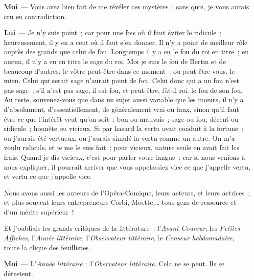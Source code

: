 \documentclass[french,twoside]{book} %
\newcommand{\labelchar}[1]{\textbf{\color{rubric} #1}}
\begin{document}
\labelchar{Moi} — Vous avez bien fait de me révéler ces mystères ; sans quoi, je vous aurais cru en contradiction.\par
\labelchar{Lui} — Je n’y suis point ; car pour une fois où il faut éviter le ridicule ; heureusement, il y en a cent où il faut s’en donner. Il n’y a point de meilleur rôle auprès des grands que celui de fou. Longtemps il y a eu le fou du roi en titre ; en aucun, il n’y a eu en titre le sage du roi. Moi je suis le fou de Bertin et de beaucoup d’autres, le vôtre peut-être dans ce moment ; ou peut-être vous, le mien. Celui qui serait sage n’aurait point de fou. Celui donc qui a un fou n’est pas sage ; s’il n’est pas sage, il est fou, et peut-être, fût-il roi, le fou de son fou. Au reste, souvenez-vous que dans un sujet aussi variable que les mœurs, il n’y a d’absolument, d’essentiellement, de généralement vrai ou faux, sinon qu’il faut être ce que l’intérêt veut qu’on soit ; bon ou mauvais ; sage ou fou, décent ou ridicule ; honnête ou vicieux. Si par hasard la vertu avait conduit à la fortune ; ou j’aurais été vertueux, ou j’aurais simulé la vertu comme un autre. On m’a voulu ridicule, et je me le suis fait ; pour vicieux, nature seule en avait fait les frais. Quand je dis vicieux, c’est pour parler votre langue ; car si nous venions à nous expliquer, il pourrait arriver que vous appelassiez vice ce que j’appelle vertu, et vertu ce que j’appelle vice.\par
Nous avons aussi les auteurs de l’Opéra-Comique, leurs acteurs, et leurs actrices ; et plus souvent leurs entrepreneurs Corbi, Moette,… tous gens de ressource et d’un mérite supérieur !\par
Et j’oubliais les grands critiques de la littérature : l’\emph{Avant-Coureur}, les\emph{ Petites Affiches}, l’\emph{Année littéraire}, l’\emph{Observateur littéraire}, le\emph{ Censeur hebdomadaire}, toute la clique des feuillistes.\par
\labelchar{Moi} — L’\emph{Année littéraire} ; l’\emph{Obervateur littéraire}. Cela ne se peut. Ils se détestent.\par
\end{document}
